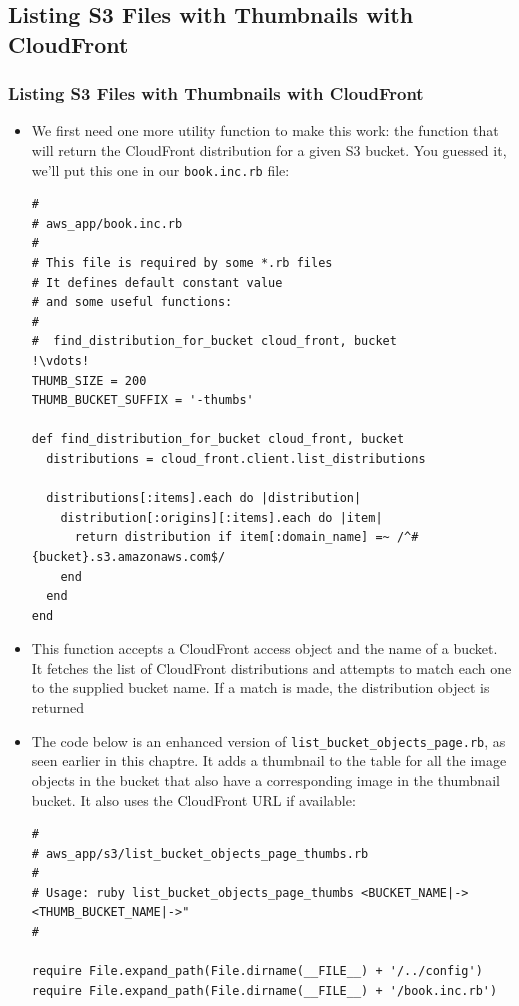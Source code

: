 \documentclass{beamer}
\begin{document}
\subsection{Listing S3 Files with Thumbnails with CloudFront}
\begin{frame}
\frametitle{Listing S3 Files with Thumbnails with CloudFront}
\begin{itemize}
\item We first need one more utility function
to make this work: the  function that will return the
CloudFront distribution for a given S3 bucket. You guessed it, we’ll put this one in
our \texttt{book.inc.rb} file:

\lstset{language=Ruby, style=eclipse}
\begin{lstlisting}[escapechar=!]
#
# aws_app/book.inc.rb
#
# This file is required by some *.rb files
# It defines default constant value
# and some useful functions:
#
#  find_distribution_for_bucket cloud_front, bucket
!\vdots!
THUMB_SIZE = 200
THUMB_BUCKET_SUFFIX = '-thumbs'

def find_distribution_for_bucket cloud_front, bucket
  distributions = cloud_front.client.list_distributions

  distributions[:items].each do |distribution|
    distribution[:origins][:items].each do |item|
      return distribution if item[:domain_name] =~ /^#{bucket}.s3.amazonaws.com$/
    end
  end
end
\end{lstlisting}

\item This function accepts a CloudFront access object and the name of a bucket. It fetches
the list of CloudFront distributions and attempts to match each one to the supplied
bucket name. If a match is made, the distribution object is returned

\item The code below is an enhanced version of \texttt{list\_bucket\_objects\_page.rb}, as seen
earlier in this chaptre. It adds a thumbnail to the table for all the image objects in
the bucket that also have a corresponding image in the thumbnail bucket. It also
uses the CloudFront URL if available:

\lstset{language=Ruby, style=eclipse}
\begin{lstlisting}[escapechar=!]
#
# aws_app/s3/list_bucket_objects_page_thumbs.rb
#
# Usage: ruby list_bucket_objects_page_thumbs <BUCKET_NAME|-> <THUMB_BUCKET_NAME|->"
#

require File.expand_path(File.dirname(__FILE__) + '/../config')
require File.expand_path(File.dirname(__FILE__) + '/book.inc.rb')


\end{lstlisting}
\end{itemize}
\end{frame}
\end{document}
